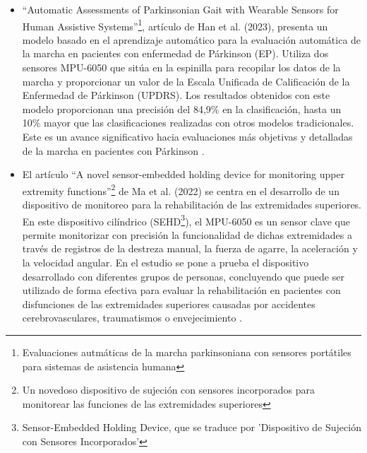 \begin{itemize}
    \item ``Automatic Assessments of Parkinsonian Gait with Wearable Sensors for Human Assistive Systems''\footnote{Evaluaciones autmáticas de la marcha parkinsoniana con sensores portátiles para sistemas de asistencia humana}, artículo de Han et al. (2023), presenta un modelo basado en el aprendizaje automático para la evaluación automática de la marcha en pacientes con enfermedad de Párkinson (EP). Utiliza dos sensores MPU-6050 que sitúa en la espinilla para recopilar los datos de la marcha y proporcionar un valor de la Escala Unificada de Calificación de la Enfermedad de Párkinson (UPDRS). Los resultados obtenidos con este modelo proporcionan una precisión del 84,9\% en la clasificación, hasta un 10\% mayor que las clasificaciones realizadas con otros modelos tradicionales. Este es un avance significativo hacia evaluaciones más objetivas y detalladas de la marcha en pacientes con Párkinson \cite{AutomaticAssessments}.
    
    \item El artículo ``A novel sensor-embedded holding device for monitoring upper extremity functions''\footnote{Un novedoso dispositivo de sujeción con sensores incorporados para monitorear las funciones de las extremidades superiores} de Ma et al. (2022) se centra en el desarrollo de un dispositivo de monitoreo para la rehabilitación de las extremidades superiores. En este dispositivo cilíndrico (SEHD\footnote{Sensor-Embedded Holding Device, que se traduce por 'Dispositivo de Sujeción con Sensores Incorporados'}), el MPU-6050 es un sensor clave que permite monitorizar con precisión la funcionalidad de dichas extremidades a través de registros de la destreza manual, la fuerza de agarre, la aceleración y la velocidad angular. En el estudio se pone a prueba el dispositivo desarrollado con diferentes grupos de personas, concluyendo que puede ser utilizado de forma efectiva para evaluar la rehabilitación en pacientes con disfunciones de las extremidades superiores causadas por accidentes cerebrovasculares, traumatismos o envejecimiento \cite{NovelSensor}.


\end{itemize}
